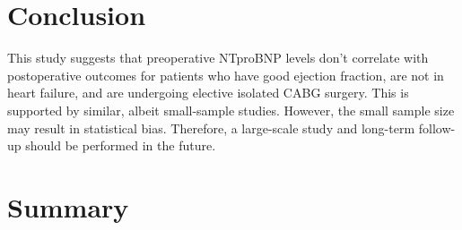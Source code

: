 \documentclass[14pt,a4paper,onecolumn]{extarticle}
\begin{document}
\section{Conclusion}

This study suggests that preoperative NTproBNP levels don't correlate with postoperative outcomes for patients who have good ejection fraction, are not in heart failure, and are undergoing elective isolated CABG surgery. This is supported by similar, albeit small-sample studies.  However, the small sample size may result in statistical bias. Therefore, a large-scale study and long-term follow-up should be performed in the future.


\section{Summary}

\newpage


\end{document}
